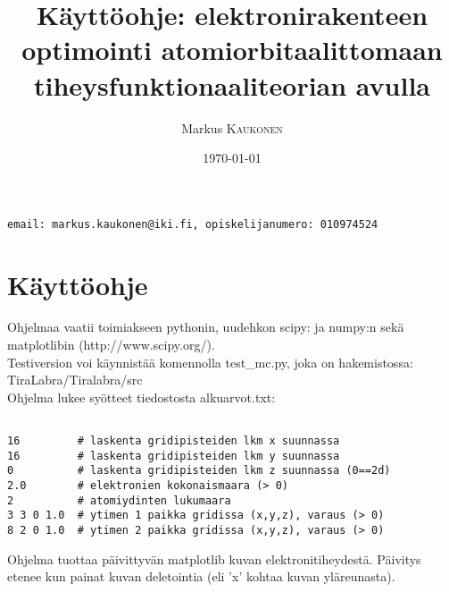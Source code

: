 \documentclass{article}
\title{Käyttöohje: elektronirakenteen optimointi atomiorbitaalittomaan tiheysfunktionaaliteorian avulla} %
\author{Markus \textsc{Kaukonen} %
}
\date{\today} %
\begin{document}
\maketitle %
\hspace{1cm} \texttt{email: markus.kaukonen@iki.fi, opiskelijanumero: 010974524}

\newpage


\section{Käyttöohje}
Ohjelmaa vaatii toimiakseen pythonin, uudehkon scipy: ja numpy:n sekä
matplotlibin (http://www.scipy.org/). \\

Testiversion voi käynnistää komennolla test\_mc.py, joka on hakemistossa:
TiraLabra/Tiralabra/src \\

Ohjelma lukee syötteet tiedostosta alkuarvot.txt:\\
\begin{small}
\begin{lstlisting}[frame=single]  % Start your code-block

16         # laskenta gridipisteiden lkm x suunnassa 
16         # laskenta gridipisteiden lkm y suunnassa 
0          # laskenta gridipisteiden lkm z suunnassa (0==2d)
2.0        # elektronien kokonaismaara (> 0)
2          # atomiydinten lukumaara
3 3 0 1.0  # ytimen 1 paikka gridissa (x,y,z), varaus (> 0)
8 2 0 1.0  # ytimen 2 paikka gridissa (x,y,z), varaus (> 0)
\end{lstlisting}
\end{small}
Ohjelma tuottaa päivittyvän matplotlib kuvan elektronitiheydestä. Päivitys etenee kun painat kuvan deletointia (eli 'x' kohtaa kuvan yläreunasta).

\end{document}
